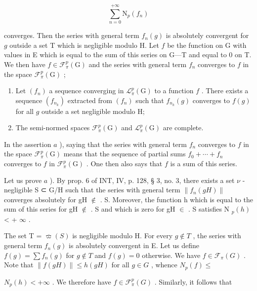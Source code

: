 \[
\sum_ {n = 0} ^ {+ \infty} \mathrm{N} _ {p} (f _ {n})
\]

converges. Then the series with general term \(f_n(g)\) is absolutely convergent for \(g\) outside a set T which is negligible modulo H. Let \(f\) be the function on G with values in E which is equal to the sum of this series on G---T and equal to 0 on T. We then have \(f \in \mathcal{F}_\pi^p(\mathrm{G})\) and the series with general term \(f_n\) converges to \(f\) in the space \(\mathcal{F}_\pi^p(\mathrm{G})\) ;

\begin{enumerate}
\def\labelenumi{\alph{enumi})}
\setcounter{enumi}{1}
\item
  Let \((f_n)\) a sequence converging in \(\mathcal{L}_{\pi}^{p}(\mathrm{G})\) to a function \(f\) . There exists a sequence \((f_{n_k})\) extracted from \((f_n)\) such that \(f_{n_k}(g)\) converges to \(f(g)\) for all \(g\) outside a set negligible modulo H;
\item
  The semi-normed spaces \(\mathcal{F}_{\pi}^{p}(\mathrm{G})\) and \(\mathcal{L}_{\pi}^{p}(\mathrm{G})\) are complete.
\end{enumerate}

In the assertion \(a\) ), saying that the series with general term \(f_n\) converges to \(f\) in the space \(\mathcal{F}_{\pi}^{p}(\mathrm{G})\) means that the sequence of partial sums \(f_0 + \cdots + f_n\) converges to \(f\) in \(\mathcal{F}_{\pi}^{p}(\mathrm{G})\) . One then also says that \(f\) is a sum of this series.

Let us prove \(a\) ). By prop. 6 of INT, IV, p. 128, § 3, no. 3, there exists a set \(\nu\) -negligible S ⊂ G/H such that the series with general term \(\|f_n(gH)\|\) converges absolutely for gH \(\notin\) . S. Moreover, the function h which is equal to the sum of this series for gH \(\notin\) . S and which is zero for gH \(\in\) . S satisfies N \(_p(h)\) \textless{} + \(\infty\) .

The set T = \(\overline{\varpi}(S)\) is negligible modulo H. For every \(g \notin T\) , the series with general term \(f_{n}(g)\) is absolutely convergent in E. Let us define \(f(g) = \sum f_{n}(g)\) for \(g \notin T\) and \(f(g) = 0\) otherwise. We have \(f \in \mathcal{F}_{\pi}(G)\) . Note that \(\|f(gH)\| \leqslant h(gH)\) for all \(g \in G\) , whence \(N_{p}(f) \leqslant\)

\(N_{p}(h) < +\infty\) . We therefore have \(f \in \mathcal{F}_{\pi}^{p}(G)\) . Similarly, it follows that

